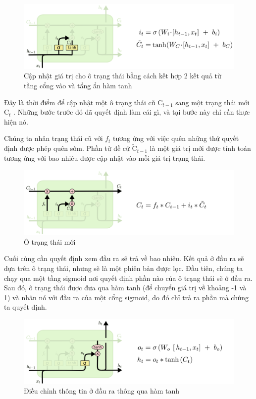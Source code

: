 \begin{figure}[H]
    \centering
    \includegraphics[width=14cm]{Images/Architecture/LSTM3-focus-i.png}
\caption{ Cập nhật giá trị cho ô trạng thái bằng cách kết hợp 2 kết quả từ tầng cổng vào và tẩng ẩn hàm tanh}
\end{figure}

\indent Đây là thời điểm để cập nhật một ô trạng thái cũ \( \text{C}_{t-1} \)
 sang một trạng thái mới \( \text{C}_{t} \)
. Những bước trước đó đã quyết định làm cái gì, và tại bước này chỉ cần thực hiện nó.

\indent Chúng ta nhân trạng thái cũ với \( f_{t} \)
 tương ứng với việc quên những thứ quyết định được phép quên sớm. Phần tử đề cử \( \tilde{\text{C}}_{t-1} \)
 là một giá trị mới được tính toán tương ứng với bao nhiêu được cập nhật vào mỗi giá trị trạng thái.

 \begin{figure}[H]
    \centering
    \includegraphics[width=14cm]{Images/Architecture/LSTM3-focus-C.png}
\caption{Ô trạng thái mới}
\end{figure}

\indent Cuối cùng cần quyết định xem đầu ra sẽ trả về bao nhiêu. Kết quả ở đầu ra sẽ dựa trên ô trạng thái, nhưng sẽ là một phiên bản được lọc. Đầu tiên, chúng ta chạy qua một tầng sigmoid nơi quyết định phần nào của ô trạng thái sẽ ở đầu ra. Sau đó, ô trạng thái được đưa qua hàm tanh (để chuyển giá trị về khoảng -1 và 1) và nhân nó với đầu ra của một cổng sigmoid, do đó chỉ trả ra phần mà chúng ta quyết định.

 \begin{figure}[H]
    \centering
    \includegraphics[width=14cm]{Images/Architecture/LSTM3-focus-o.png}
\caption{Điều chỉnh thông tin ở đầu ra thông qua hàm tanh}
\end{figure}

